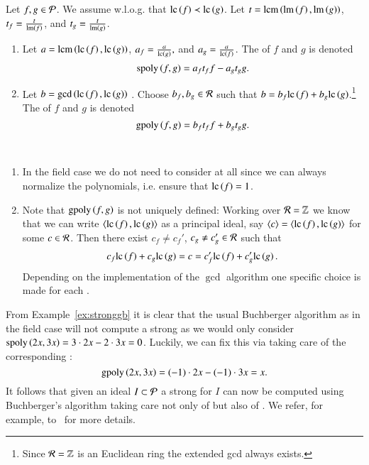 \begin{definition}
\label{def:spoly}
Let $f,g \in \mathcal{P}$. We assume w.l.o.g. that $\mathrm{lc}\left({f}\right) \prec \mathrm{lc}\left({g}\right)$.
Let $t = \operatorname{lcm}\left(\operatorname{lm}\left({f}\right), \operatorname{lm}\left({g}\right)\right)$, $t_f = \frac{t}{\operatorname{lm}\left({f}\right)}$, and $t_g = \frac{t}{\operatorname{lm}\left({g}\right)}$.
\begin{enumerate}
\item Let $a = \operatorname{lcm}\left(\mathrm{lc}\left({f}\right), \mathrm{lc}\left({g}\right)\right)$, $a_f = \frac{a}{\mathrm{lc}\left({g}\right)},$ and $a_g =
\frac{a}{\mathrm{lc}\left({f}\right)}$. The \emph{\spt} of $f$ and $g$ is denoted 
\[\mathrm{spoly}\left({f},{g}\right) = a_f t_f f - a_g t_g g.\]
\item Let $b = \gcd\left(\mathrm{lc}\left({f}\right), \mathrm{lc}\left({g}\right)\right)$ . Choose $b_f, b_g \in \mathcal{R}$ such that $b = b_f \mathrm{lc}\left({f}\right) + b_g \mathrm{lc}\left({g}\right)$.\footnote{Since $\mathcal{R} = \mathbb{Z}$ is an Euclidean ring the extended gcd always exists.}
The \emph{\gpt} of $f$ and $g$ is denoted 
\[\mathrm{gpoly}\left({f},{g}\right) = b_f t_f f + b_g t_g g.\]
\end{enumerate}
\end{definition}

\begin{remark} \
\label{rem:gpairs}
\begin{enumerate}
\item In the field case we do not need to consider \gpts at all since we can
always normalize the polynomials, i.e. ensure that $\mathrm{lc}\left({f}\right) = 1$.
\item Note that $\mathrm{gpoly}\left({f},{g}\right)$ is not uniquely defined: Working over $\mathcal{R} = \mathbb{Z}$ we
know that we can write $\langle \mathrm{lc}\left({f}\right), \mathrm{lc}\left({g}\right) \rangle$ as a principal ideal, say
$\langle c \rangle = \langle \mathrm{lc}\left({f}\right), \mathrm{lc}\left({g}\right) \rangle$ for some $c\in\mathcal{R}$. Then
there exist $c_f \neq c_f'$, $c_g \neq c_g' \in \mathcal{R}$ such that
\[c_f \mathrm{lc}\left({f}\right) + c_g \mathrm{lc}\left({g}\right) = c = c_f' \mathrm{lc}\left({f}\right) + c_g' \mathrm{lc}\left({g}\right).\]
Depending on the implementation of the $\gcd$ algorithm one specific choice is
made for each \gpt.
\end{enumerate}
\end{remark}

From Example~\ref{ex:stronggb} it is clear that the usual Buchberger
algorithm as in the field case will not compute a strong \stb as we would only
consider $\mathrm{spoly}\left({2x},{3x}\right) = 3 \cdot 2x - 2 \cdot 3x = 0$. Luckily, we
can fix this via taking care of the corresponding \gpt:
\[\mathrm{gpoly}\left({2x},{3x}\right) = (-1) \cdot 2x - (-1) \cdot 3x = x.\]
It follows that given an ideal $I \subset \mathcal{P}$ a strong \stb for $I$ can now be computed using
Buchberger's algorithm taking care not only of \spts but also of \gpts. We refer,
for example,  to~\cite{lichtblau2012} for more details.

